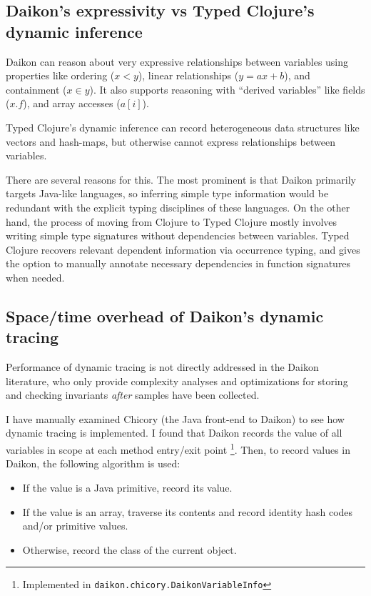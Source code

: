 \subsection{Daikon's expressivity vs Typed Clojure's dynamic inference}

Daikon can reason about very expressive relationships between variables
using properties like ordering ($x < y$), linear relationships ($y = ax + b$),
and containment ($x \in y$). It also supports reasoning with ``derived variables''
like fields ($x.f$), and array accesses ($a[i]$).

Typed Clojure's dynamic inference can record heterogeneous data structures
like vectors and hash-maps, but otherwise cannot express relationships
between variables.

There are several reasons for this. The most prominent is that Daikon
primarily targets Java-like languages, so inferring simple type information
would be redundant with the explicit typing disciplines of these languages.
On the other hand, the process of moving from Clojure to Typed Clojure
mostly involves writing simple type signatures without dependencies
between variables. Typed Clojure recovers relevant dependent information
via occurrence typing, and gives the option to manually annotate necessary
dependencies in function signatures when needed.

\subsection{Space/time overhead of Daikon's dynamic tracing}

Performance of dynamic tracing is not directly addressed in the Daikon
literature, who only provide complexity analyses and optimizations for storing
and checking invariants \emph{after} samples have been collected.

I have manually examined Chicory (the Java front-end to Daikon) to see how
dynamic tracing is implemented.
I found that Daikon records the value of all variables in scope
at each method entry/exit point \footnote{Implemented in \texttt{daikon.chicory.DaikonVariableInfo}}.
Then, to record values in Daikon, the following algorithm is used:

\begin{itemize}
  \item If the value is a Java primitive, record its value.
  \item If the value is an array, traverse its contents and record identity hash codes
    and/or primitive values.
  \item Otherwise, record the class of the current object.
\end{itemize}

